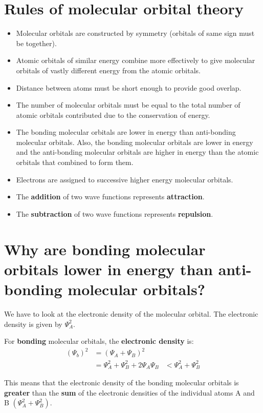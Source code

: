 \documentclass[11pt]{article}
\begin{document}
\newpage
\section{Rules of molecular orbital theory}
\label{sec:org81f5f9c}
\begin{itemize}
\item Molecular orbitals are constructed by symmetry (orbitals of same sign must be together).
\item Atomic orbitals of similar energy combine more effectively to give molecular orbitals of vastly different energy from the atomic orbitals.
\item Distance between atoms must be short enough to provide good overlap.
\item The number of molecular orbitals must be equal to the total number of atomic orbitals contributed due to the conservation of energy.
\item The bonding molecular orbitals are lower in energy than anti-bonding molecular orbitals. Also, the bonding molecular orbitals are lower in energy and the anti-bonding molecular orbitals are higher in energy than the atomic orbitals that combined to form them.
\item Electrons are assigned to successive higher energy molecular orbitals.
\item The \textbf{addition} of two wave functions represents \textbf{attraction}.
\item The \textbf{subtraction} of two wave functions represents \textbf{repulsion}.
\end{itemize}

\newpage
\section{Why are bonding molecular orbitals lower in energy than anti-bonding molecular orbitals?}
\label{sec:org9414d47}
We have to look at the electronic density of the molecular orbital. The electronic density is given by \(\Psi_A^2\).


For \textbf{bonding} molecular orbitals, the \textbf{electronic density} is:
\begin{align*}
(\Psi_b)^2 &= (\Psi_A + \Psi_B)^2 \\
&= \Psi_A^2 + \Psi_B^2 + 2 \Psi_A \Psi_B
&< \Psi_A^2 + \Psi_B^2
\end{align*}

This means that the electronic density of the bonding molecular orbitals is \textbf{greater} than the \textbf{sum} of the electronic densities of the individual atoms A and B \((\Psi_A^2 + \Psi_B^2)\).
\end{document}
